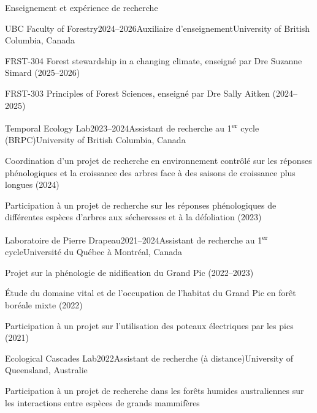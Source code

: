\documentclass[
	11pt, %
]{resume} %
\begin{document}
\begin{rSection}{Enseignement et expérience de recherche}

	\begin{rSubsection}{UBC Faculty of Forestry}{2024--2026}{Auxiliaire d'enseignement}{University of British Columbia, Canada}
		\item FRST-304 Forest stewardship in a changing climate, enseigné par Dre Suzanne Simard (2025--2026) 
		\item FRST-303 Principles of Forest Sciences, enseigné par Dre Sally Aitken (2024--2025) 
	\end{rSubsection}
	\begin{rSubsection}{Temporal Ecology Lab}{2023--2024}{Assistant de recherche au 1\textsuperscript{er} cycle (BRPC)}{University of British Columbia, Canada}
		\item Coordination d’un projet de recherche en environnement contrôlé sur les réponses phénologiques et la croissance des arbres face à des saisons de croissance plus longues (2024)
		\item Participation à un projet de recherche sur les réponses phénologiques de différentes espèces d’arbres aux sécheresses et à la défoliation (2023)
	\end{rSubsection}
	\begin{rSubsection}{Laboratoire de Pierre Drapeau}{2021--2024}{Assistant de recherche au 1\textsuperscript{er} cycle}{Université du Québec à Montréal, Canada}
		\item Projet sur la phénologie de nidification du Grand Pic (2022--2023)
		\item Étude du domaine vital et de l’occupation de l’habitat du Grand Pic en forêt boréale mixte (2022)
		\item Participation à un projet sur l’utilisation des poteaux électriques par les pics (2021)
	\end{rSubsection}
	\begin{rSubsection}{Ecological Cascades Lab}{2022}{Assistant de recherche (à distance)}{University of Queensland, Australie}
		\item Participation à un projet de recherche dans les forêts humides australiennes sur les interactions entre espèces de grands mammifères
	\end{rSubsection}
\end{rSection}
\end{document}
